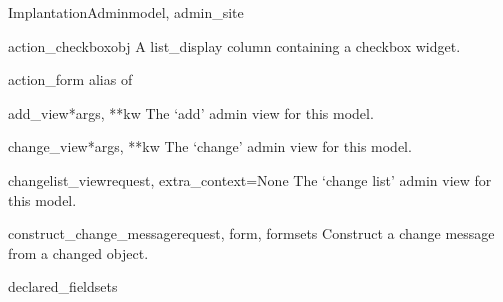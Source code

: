 \documentclass[letterpaper,10pt,english]{sphinxmanual}
\begin{document}
\hypertarget{data.admin.ImplantationAdmin}{}\begin{classdesc}{ImplantationAdmin}{model, admin\_site}~

\hypertarget{data.admin.ImplantationAdmin.action_checkbox}{}\begin{methoddesc}{action\_checkbox}{obj}
A list\_display column containing a checkbox widget.
\end{methoddesc}

\hypertarget{data.admin.ImplantationAdmin.action_form}{}\begin{memberdesc}{action\_form}
alias of 
\end{memberdesc}

\hypertarget{data.admin.ImplantationAdmin.add_view}{}\begin{methoddesc}{add\_view}{*args, **kw}
The `add' admin view for this model.
\end{methoddesc}

\hypertarget{data.admin.ImplantationAdmin.change_view}{}\begin{methoddesc}{change\_view}{*args, **kw}
The `change' admin view for this model.
\end{methoddesc}

\hypertarget{data.admin.ImplantationAdmin.changelist_view}{}\begin{methoddesc}{changelist\_view}{request, extra\_context=None}
The `change list' admin view for this model.
\end{methoddesc}

\hypertarget{data.admin.ImplantationAdmin.construct_change_message}{}\begin{methoddesc}{construct\_change\_message}{request, form, formsets}
Construct a change message from a changed object.
\end{methoddesc}

\hypertarget{data.admin.ImplantationAdmin.declared_fieldsets}{}\begin{memberdesc}{declared\_fieldsets}\end{memberdesc}


\end{classdesc}
\end{document}
